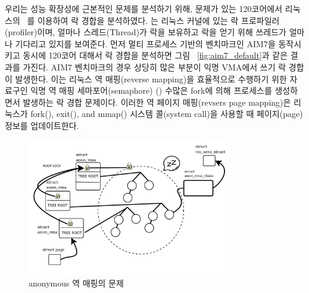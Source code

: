 
우리는 성능 확장성에 근본적인 문제를 분석하기 위해, 문제가 있는 120코어에서 리눅스의
 ~\cite{LOCKSTAT}를 이용하여 락 경합을 분석하였다.
 는 리눅스 커널에 있는 락 프로파일러(profiler)이며, 얼마나 스레드(Thread)가 락을 보유하고 
 락을 얻기 위해 쓰레드가 얼마나 기다리고 있지를 보여준다.
먼저 멀티 프로세스 기반의 벤치마크인 AIM7을 동작시키고 동시에 120코어 대해서 락 경합을 분석하면 
그림 ~\ref{fig:aim7_default}과 같은 결과를 가진다. 
AIM7 벤치마크의 경우 상당히 많은 부분이 익명 VMA에서 쓰기 락 경합이 발생한다. 
이는 리눅스 역 매핑(reverse mapping)을 효율적으로 수행하기 위한 자료구인 익명 역 매핑 세마포어(semaphore)
() 수많은 fork에 의해 프로세스를 생성하면서 발생하는 락 경합 문제이다.
이러한 역 페이지 매핑(revsers page mapping)은 리눅스가 fork(), exit(), and mmap() 시스템
콜(system call)을 사용할 때 페이지(page) 정보를 업데이트한다.


 \begin{figure}[h]
    \centering
    \includegraphics[width=0.8\textwidth]{fig/anon_vma_rmap}
    \caption{anonymous 역 매핑의 문제}
  \label{fig:anon_vma_rmap}
\end{figure}


